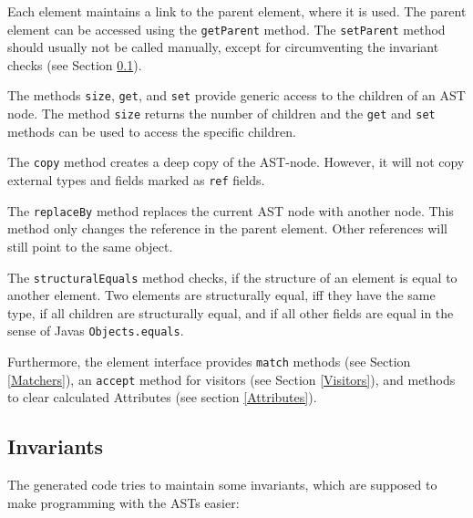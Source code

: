 \documentclass{scrartcl}
\begin{document}
Each element maintains a link to the parent element, where it is used.
The parent element can be accessed using the \lstinline!getParent! method.
The \lstinline!setParent! method should usually not be called manually, except for circumventing the invariant checks (see Section \ref{Invariants}).

The methods \lstinline!size!, \lstinline!get!, and \lstinline!set! provide generic access to the children of an AST node.
The method \lstinline!size! returns the number of children and the \lstinline!get! and \lstinline!set! methods can be used to access the specific children.

The \lstinline!copy! method creates a deep copy of the AST-node. However, it will not copy external types and fields marked as \lstinline!ref! fields.

The \lstinline!replaceBy! method replaces the current AST node with another node.
This method only changes the reference in the parent element.
Other references will still point to the same object.

The \lstinline!structuralEquals! method checks, if the structure of an element is equal to another element.
Two elements are structurally equal, iff they have the same type, if all children are structurally equal, and if all other fields are equal in the sense of Javas \lstinline!Objects.equals!.

Furthermore, the element interface provides \lstinline!match! methods (see Section \ref{Matchers}), an \lstinline!accept! method for visitors (see Section \ref{Visitors}), and methods to clear calculated Attributes (see section \ref{Attributes}).



\subsection{Invariants}
\label{Invariants}

The generated code tries to maintain some invariants, which are supposed to make programming with the ASTs easier:
\end{document}
